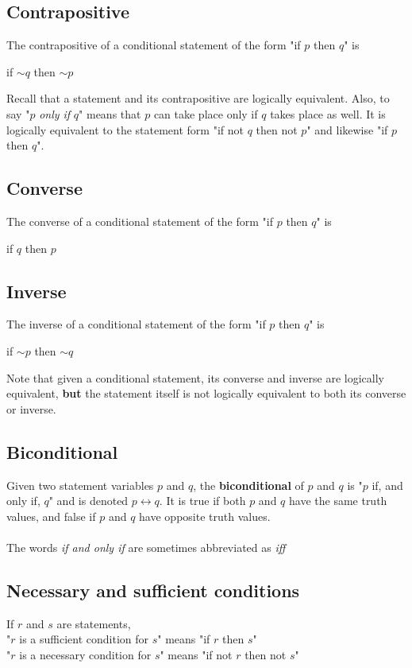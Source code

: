 \documentclass[a4paper]{article}
\begin{document}
\subsection{Contrapositive}
The contrapositive of a conditional statement of the form "if $p$ then $q$" is 
\begin{center}
	if $\sim q$ then $\sim p$
\end{center}
Recall that a statement and its contrapositive are logically equivalent.
Also, to say "$p$ \textit{only if} $q$" means that $p$ can take place only if $q$ takes place as well. It is logically equivalent to the statement form "if not $q$ then not $p$" and likewise "if $p$ then $q$".
\subsection{Converse}
The converse of a conditional statement of the form "if $p$ then $q$" is
\begin{center}
	if $q$ then $p$
\end{center}
\subsection{Inverse}
The inverse of a conditional statement of the form "if $p$ then $q$" is
\begin{center}
	if $\sim p$ then $\sim q$
\end{center}
Note that given a conditional statement, its converse and inverse are logically equivalent, \textbf{but} the statement itself is not logically equivalent to both its converse or inverse.
\subsection{Biconditional}
Given two statement variables $p$ and $q$, the \textbf{biconditional} of $p$ and $q$ is "$p$ if, and only if, $q$" and is denoted $p \leftrightarrow q$. It is true if both $p$ and $q$ have the same truth values, and false if $p$ and $q$ have opposite truth values.\\
\\The words \textit{if and only if} are sometimes abbreviated as \textit{iff}
\subsection{Necessary and sufficient conditions}
If $r$ and $s$ are statements,\\
"$r$ is a sufficient condition for $s$" means "if $r$ then $s$"\\
"$r$ is a necessary condition for $s$" means "if not $r$ then not $s$"
\end{document}
